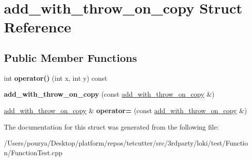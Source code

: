 \hypertarget{structadd__with__throw__on__copy}{}\section{add\+\_\+with\+\_\+throw\+\_\+on\+\_\+copy Struct Reference}
\label{structadd__with__throw__on__copy}
\subsection*{Public Member Functions}
\begin{DoxyCompactItemize}
\item 
\hypertarget{structadd__with__throw__on__copy_a4cce9779431aa379b5550d13c081bc7e}{}int {\bfseries operator()} (int x, int y) const \label{structadd__with__throw__on__copy_a4cce9779431aa379b5550d13c081bc7e}

\item 
\hypertarget{structadd__with__throw__on__copy_a1ba10356b70ee853801bbdca5fa0f016}{}{\bfseries add\+\_\+with\+\_\+throw\+\_\+on\+\_\+copy} (const \hyperlink{structadd__with__throw__on__copy}{add\+\_\+with\+\_\+throw\+\_\+on\+\_\+copy} \&)\label{structadd__with__throw__on__copy_a1ba10356b70ee853801bbdca5fa0f016}

\item 
\hypertarget{structadd__with__throw__on__copy_a2a3592155a7fe8ac1badc687559c0471}{}\hyperlink{structadd__with__throw__on__copy}{add\+\_\+with\+\_\+throw\+\_\+on\+\_\+copy} \& {\bfseries operator=} (const \hyperlink{structadd__with__throw__on__copy}{add\+\_\+with\+\_\+throw\+\_\+on\+\_\+copy} \&)\label{structadd__with__throw__on__copy_a2a3592155a7fe8ac1badc687559c0471}

\end{DoxyCompactItemize}


The documentation for this struct was generated from the following file\+:\begin{DoxyCompactItemize}
\item 
/\+Users/pourya/\+Desktop/platform/repos/tetcutter/src/3rdparty/loki/test/\+Function/Function\+Test.\+cpp\end{DoxyCompactItemize}
